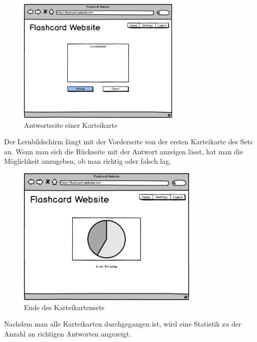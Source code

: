 \begin{figure}[H]
    \centering
    \includegraphics[width=0.7\textwidth]{images/Lernscreen-Antwort.png}
    \caption{Antwortseite einer Karteikarte}
    \label{fig:lernscreen-antwort}
\end{figure}

Der Lernbildschirm fängt mit der Vorderseite von der ersten Karteikarte des Sets an. Wenn man sich die Rückseite mit der Antwort anzeigen lässt, hat man die Möglichkeit anzugeben, ob man richtig oder falsch lag.

\begin{figure}[H]
    \centering
    \includegraphics[width=0.78\textwidth]{images/Lernscreen-Ergebnis.png}
    \caption{Ende des Karteikartensets}
    \label{fig:lernscreen-ergbenis}
\end{figure}

\noindent Nachdem man alle Karteikarten durchgegangen ist, wird eine Statistik zu der Anzahl an richtigen Antworten angezeigt.
